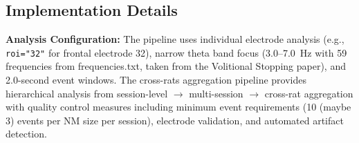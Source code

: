 \documentclass[11pt]{article}
\begin{document}
\subsection{Implementation Details}

\textbf{Analysis Configuration:} The pipeline uses individual electrode analysis (e.g., \texttt{roi="32"} for frontal electrode 32), narrow theta band focus (3.0--7.0~Hz with 59 frequencies from frequencies.txt, taken from the Volitional Stopping paper), and 2.0-second event windows. The cross-rats aggregation pipeline provides hierarchical analysis from session-level $\rightarrow$ multi-session $\rightarrow$ cross-rat aggregation with quality control measures including minimum event requirements (10 (maybe 3) events per NM size per session), electrode validation, and automated artifact detection.
\end{document}
